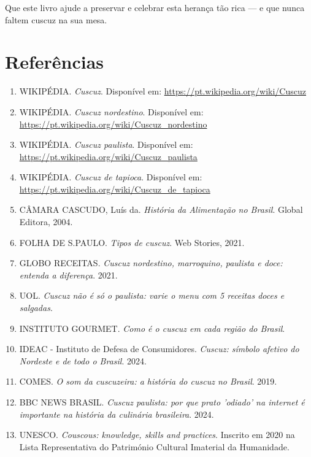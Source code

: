 \documentclass[12pt,a4paper,openright]{book}
\begin{document}
Que este livro ajude a preservar e celebrar esta herança tão rica --- e que nunca faltem cuscuz na sua mesa.

\chapter*{Referências}

\begin{enumerate}
    \item WIKIPÉDIA. \textit{Cuscuz}. Disponível em: \url{https://pt.wikipedia.org/wiki/Cuscuz}
    \item WIKIPÉDIA. \textit{Cuscuz nordestino}. Disponível em: \url{https://pt.wikipedia.org/wiki/Cuscuz_nordestino}
    \item WIKIPÉDIA. \textit{Cuscuz paulista}. Disponível em: \url{https://pt.wikipedia.org/wiki/Cuscuz_paulista}
    \item WIKIPÉDIA. \textit{Cuscuz de tapioca}. Disponível em: \url{https://pt.wikipedia.org/wiki/Cuscuz_de_tapioca}
    \item CÂMARA CASCUDO, Luís da. \textit{História da Alimentação no Brasil}. Global Editora, 2004.
    \item FOLHA DE S.PAULO. \textit{Tipos de cuscuz}. Web Stories, 2021.
    \item GLOBO RECEITAS. \textit{Cuscuz nordestino, marroquino, paulista e doce: entenda a diferença}. 2021.
    \item UOL. \textit{Cuscuz não é só o paulista: varie o menu com 5 receitas doces e salgadas}.
    \item INSTITUTO GOURMET. \textit{Como é o cuscuz em cada região do Brasil}.
    \item IDEAC - Instituto de Defesa de Consumidores. \textit{Cuscuz: símbolo afetivo do Nordeste e de todo o Brasil}. 2024.
    \item COMES. \textit{O som da cuscuzeira: a história do cuscuz no Brasil}. 2019.
    \item BBC NEWS BRASIL. \textit{Cuscuz paulista: por que prato 'odiado' na internet é importante na história da culinária brasileira}. 2024.
    \item UNESCO. \textit{Couscous: knowledge, skills and practices}. Inscrito em 2020 na Lista Representativa do Património Cultural Imaterial da Humanidade.
\end{enumerate}
\end{document}
